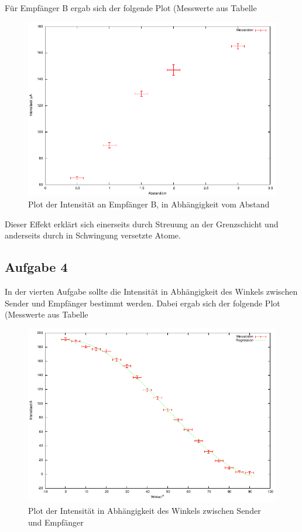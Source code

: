 \documentclass[12pt]{scrartcl}
\begin{document}
Für Empfänger B ergab sich der folgende Plot (Messwerte aus Tabelle %

\begin{figure}[H]
\centering
    \includegraphics[scale = 1]{a_3_B.pdf}
  	\caption[Plot der Intensität an Empfänger B, in Abhängigkeit vom Abstand]{Plot der Intensität an Empfänger B, in Abhängigkeit vom Abstand}
  \label{fig:a_3_B}
\end{figure}

Dieser Effekt erklärt sich einerseits durch Streuung an der Grenzschicht und anderseits durch in Schwingung versetzte Atome.

\subsection{Aufgabe 4}
In der vierten Aufgabe sollte die Intensität in Abhängigkeit des Winkels zwischen Sender und Empfänger bestimmt werden. Dabei ergab sich der folgende Plot (Messwerte aus Tabelle %

\begin{figure}[H]
\centering
    \includegraphics[scale = 1]{a_4.pdf}
  	\caption[Plot der Intensität in Abhängigkeit des Winkels zwischen Sender und Empfänger]{Plot der Intensität in Abhängigkeit des Winkels zwischen Sender und Empfänger}
  \label{fig:a_4}
\end{figure}
\end{document}
